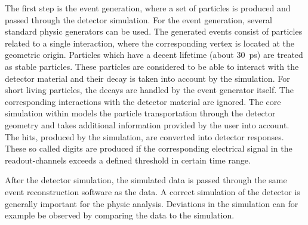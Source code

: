  
 The first step is the event generation, where a set of particles is produced and passed through the detector simulation. 
For the event generation, several standard physic generators can be used. 
 The generated events consist of particles  related to a single interaction, where the corresponding vertex is located at the geometric origin. 
 Particles which have a decent lifetime (about 30~ps) are treated as stable particles. These particles are considered to be able to interact with the detector material and their decay is taken into account by the simulation. For short living particles, the decays are handled by the event generator itself. The corresponding interactions with the detector material are ignored.  
The core simulation within   models the particle transportation through the detector geometry and takes additional information provided by the user into account. The hits,  produced by the simulation, are converted into detector responses. These so called digits are produced  if the corresponding electrical signal in the readout-channels exceeds a defined threshold in certain time range. ~\cite{Aad:2010ah} 

After the detector simulation, the simulated data is passed through the same event reconstruction software as the data.
A correct simulation of the detector is generally  important for the physic analysis. Deviations in the simulation can  for example be observed by comparing the data to the simulation.
